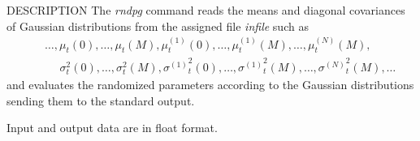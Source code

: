 \begin{qsection}{DESCRIPTION}
        The {\em rndpg} command reads the means and diagonal covariances
        of Gaussian distributions from the assigned file {\em infile}
        such as
 \begin{eqnarray}
	&& \ldots, \mu_t(0), \ldots, \mu_t(M),
		\mu^{(1)}_t(0), \ldots, \mu^{(1)}_t(M),
		\ldots, \mu^{(N)}_t(M),
		\nonumber\\
	&& ~~~~~~\sigma^2_t(0), \ldots, \sigma^2_t(M),
		{\sigma^{(1)}}^2_t(0), \ldots, {\sigma^{(1)}}^2_t(M),
		\ldots, {\sigma^{(N)}}^2_t(M),
		\ldots \nonumber
 \end{eqnarray}
        and evaluates the randomized parameters according to the 
	Gaussian distributions 
        sending them to the standard output.

	Input and output data are in float format.

\end{qsection}

